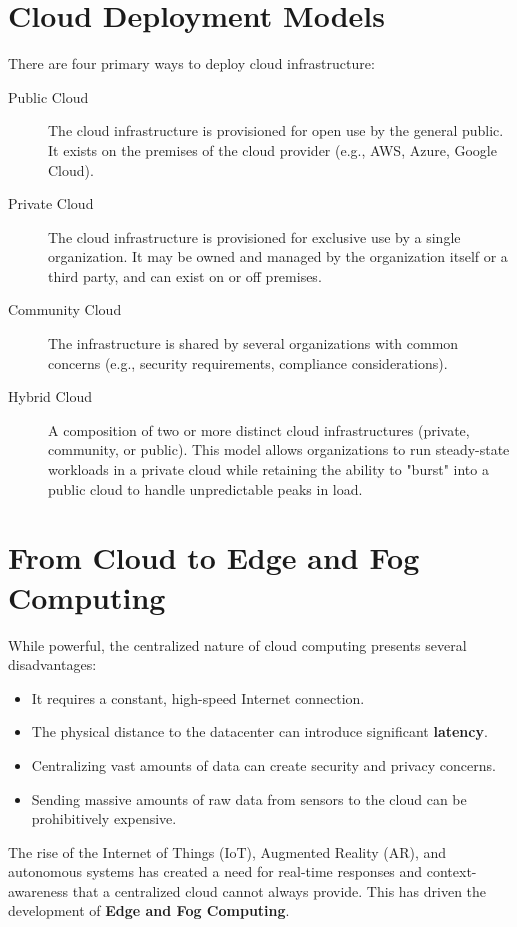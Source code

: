 \section{Cloud Deployment Models}
There are four primary ways to deploy cloud infrastructure:
\begin{description}
    \item[Public Cloud] The cloud infrastructure is provisioned for open use by the general public. It exists on the premises of the cloud provider (e.g., AWS, Azure, Google Cloud).
    \item[Private Cloud] The cloud infrastructure is provisioned for exclusive use by a single organization. It may be owned and managed by the organization itself or a third party, and can exist on or off premises.
    \item[Community Cloud] The infrastructure is shared by several organizations with common concerns (e.g., security requirements, compliance considerations).
    \item[Hybrid Cloud] A composition of two or more distinct cloud infrastructures (private, community, or public). This model allows organizations to run steady-state workloads in a private cloud while retaining the ability to "burst" into a public cloud to handle unpredictable peaks in load.
\end{description}

\section{From Cloud to Edge and Fog Computing}
While powerful, the centralized nature of cloud computing presents several disadvantages:
\begin{itemize}
    \item It requires a constant, high-speed Internet connection.
    \item The physical distance to the datacenter can introduce significant \textbf{latency}.
    \item Centralizing vast amounts of data can create security and privacy concerns.
    \item Sending massive amounts of raw data from sensors to the cloud can be prohibitively expensive.
\end{itemize}

The rise of the Internet of Things (IoT), Augmented Reality (AR), and autonomous systems has created a need for real-time responses and context-awareness that a centralized cloud cannot always provide. This has driven the development of \textbf{Edge and Fog Computing}.

